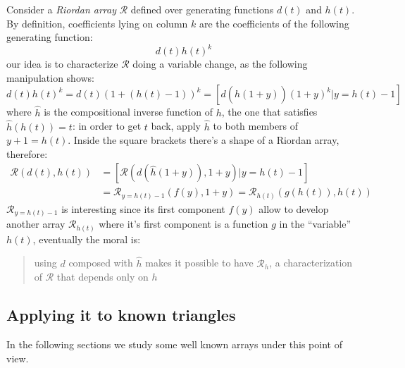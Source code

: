 \documentclass[11pt,a4paper]{article} %
\begin{document}
    Consider a \emph{Riordan array} $\mathcal{R}$ defined over generating
    functions $d(t)$ and $h(t)$. By definition, coefficients lying on 
    column $k$ are the coefficients of the following generating function:
    \begin{displaymath}
        d(t)h(t)^k
    \end{displaymath}
    our idea is to characterize $\mathcal{R}$ doing a variable change, as the
    following manipulation shows:
    \begin{displaymath}
        d(t)h(t)^k = d(t)(1 + (h(t)-1))^k = \left[ d(\hat{h}(1+y))(1+y)^k \left| y = h(t)-1 \right. \right]
    \end{displaymath}
    where $\hat{h}$ is the compositional inverse function of $h$, the one that
    satisfies $\hat{h}(h(t)) = t$: in order to get $t$ back, apply $\hat{h}$ to
    both members of $y+1 = h(t)$.
    Inside the square brackets there's a shape of a Riordan array, therefore:
    \begin{displaymath}
        \begin{split}
            \mathcal{R}\left(d(t),h(t)\right) &= \left[ \mathcal{R}\left(d(\hat{h}(1+y)), 1+y\right) \left| y = h(t)-1 \right. \right]\\
            &= \mathcal{R}_{y=h(t)-1}\left( f(y), 1+y \right) =  \mathcal{R}_{h(t)}\left( g(h(t)), h(t) \right) 
        \end{split}
    \end{displaymath}
    $\mathcal{R}_{y=h(t)-1}$ is interesting since its first component $f(y)$ allow to 
    develop another array $\mathcal{R}_{h(t)}$ where it's first component
    is a function $g$ in the ``variable'' $h(t)$, eventually the moral is:
    \begin{verse}
        using $d$ composed with $\hat{h}$ makes it possible to have $\mathcal{R}_{h}$,
        a characterization of $\mathcal{R}$ that depends only on $h$
    \end{verse}

    \subsection{Applying it to known triangles}

    In the following sections we study some well known arrays under this point of view.
\end{document}
